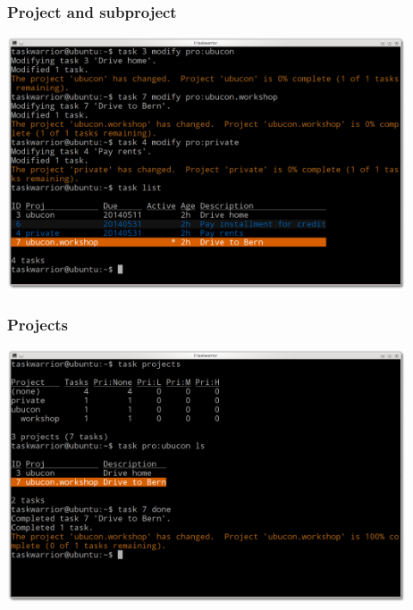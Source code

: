 \documentclass[t,handout]{beamer}
\begin{document}
\begin{frame}[fragile]\frametitle{Project and subproject}
\begin{center} %
\includegraphics[width=11.8cm,height=7.5cm]{project-and-subproject.png}
\end{center}
\end{frame}

\begin{frame}[fragile]\frametitle{Projects}
\begin{center} %
\includegraphics[width=11.8cm,height=7.5cm]{projects.png}
\end{center}
\end{frame}
\end{document}
